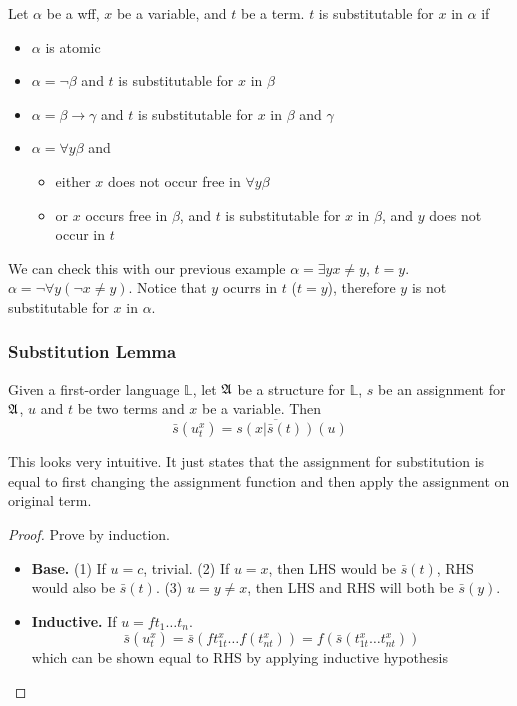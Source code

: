 \begin{definition}[Substitutability]
    Let $\alpha$ be a wff, $x$ be a variable, and $t$ be a term. $t$ is substitutable for $x$ in $\alpha$ if
    \begin{itemize}
        \item $\alpha$ is atomic
        \item $\alpha = \neg\beta$ and $t$ is substitutable for $x$ in $\beta$
        \item $\alpha = \beta \to \gamma$ and $t$ is substitutable for $x$ in $\beta$ and $\gamma$
        \item $\alpha = \forall y \beta$ and
        \begin{itemize}
            \item either $x$ does not occur free in $\forall y \beta$
            \item or $x$ occurs free in $\beta$, and $t$ is substitutable for $x$ in $\beta$, and $y$ does not occur in $t$
        \end{itemize}
    \end{itemize}
\end{definition}

We can check this with our previous example $\alpha = \exists y x\neq y$, $t=y$. $\alpha = \neg\forall y (\neg x \neq y)$. Notice that $y$ ocurrs in $t$ ($t=y$), therefore $y$ is not substitutable for $x$ in $\alpha$.

\subsubsection{Substitution Lemma}

\begin{lemma}
    Given a first-order language $\mathbb{L}$, let $\mathfrak{A}$ be a structure for $\mathbb{L}$, $s$ be an assignment for $\mathfrak{A}$, $u$ and $t$ be two terms and $x$ be a variable. Then
    \[ \bar{s}(u_t^x) = \overline{s(x|\bar{s}(t))}(u) \]
\end{lemma}

This looks very intuitive. It just states that the assignment for substitution is equal to first changing the assignment function and then apply the assignment on original term.

\begin{proof}
    Prove by induction.
    \begin{itemize}
        \item[] \textbf{Base.} (1) If $u = c$, trivial. (2) If $u=x$, then LHS would be $\bar{s}(t)$, RHS would also be $\bar{s}(t)$. (3) $u=y\neq x$, then LHS and RHS will both be $\bar{s}(y)$.
        \item[] \textbf{Inductive.} If $u = ft_1\dots t_n$.
        \[ \bar{s}(u_t^x) = \bar{s}(ft_{1t}^x\dots f(t_{nt}^x)) = f(\bar{s}(t_{1t}^x\dots t_{nt}^x)) \]
        which can be shown equal to RHS by applying inductive hypothesis
    \end{itemize}
\end{proof}

